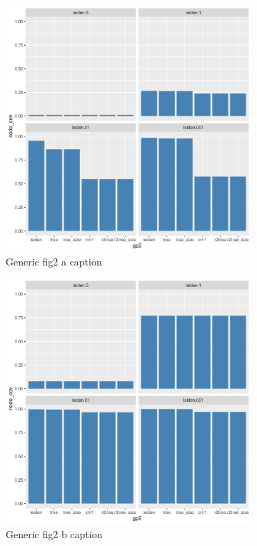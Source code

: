 \documentclass[12pt, oneside]{article}   	%
\begin{document}
\begin{figure}[H]
\centering
\begin{subfigure}[t]{0.48\textwidth}
\centering
\includegraphics[width=0.9\linewidth]{cit_patents.pdf}
\caption{Generic fig2 a caption} \label{fig:2a}
\end{subfigure}
\hfill
\begin{subfigure}[t]{0.48\textwidth}
\centering
\includegraphics[width=0.9\linewidth]{lfr_wtp_0.5.pdf} 
\caption{Generic fig2 b caption} \label{fig:2a}
\end{subfigure}
\caption{}
\label{fig:overlapping}
\end{figure}
		
\end{document}
